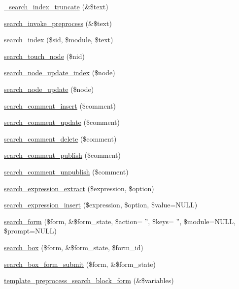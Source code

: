 \begin{DoxyCompactItemize}
\item 
\hyperlink{search_8module_a8cad6e5cadb04b33e53bd4872b8f37b4}{\_\-search\_\-index\_\-truncate} (\&\$text)
\item 
\hyperlink{search_8module_ae0bcee62601fbc35d2651764a04e5591}{search\_\-invoke\_\-preprocess} (\&\$text)
\item 
\hyperlink{group__search_ga57ab9f6e1c404a8c248293e554373ae6}{search\_\-index} (\$sid, \$module, \$text)
\item 
\hyperlink{search_8module_a7f33ab55bf14157d58997bbe149e515d}{search\_\-touch\_\-node} (\$nid)
\item 
\hyperlink{search_8module_ad314916727aaf74780b647fa381c89f6}{search\_\-node\_\-update\_\-index} (\$node)
\item 
\hyperlink{search_8module_a1067f1570b24d9647ec628bd93762bdd}{search\_\-node\_\-update} (\$node)
\item 
\hyperlink{search_8module_ade210f9ad2bba0665dfa46416c4b5377}{search\_\-comment\_\-insert} (\$comment)
\item 
\hyperlink{search_8module_a7bafc7986e46077bb7a03f9a5eeb05b2}{search\_\-comment\_\-update} (\$comment)
\item 
\hyperlink{search_8module_aafce819db105850b1570206f6dde2797}{search\_\-comment\_\-delete} (\$comment)
\item 
\hyperlink{search_8module_a33789acc1f4a944bf59f439e50eda30c}{search\_\-comment\_\-publish} (\$comment)
\item 
\hyperlink{search_8module_a6f61fc78d6436593fffa74762fb281b1}{search\_\-comment\_\-unpublish} (\$comment)
\item 
\hyperlink{search_8module_a6d0e1560509bebe41ba4c6a2959ce59c}{search\_\-expression\_\-extract} (\$expression, \$option)
\item 
\hyperlink{search_8module_a90b4fc5f716558dc1bf741c239fe1a0e}{search\_\-expression\_\-insert} (\$expression, \$option, \$value=NULL)
\item 
\hyperlink{group__search_gae12dc9da20e7e19853dfc18f92039d98}{search\_\-form} (\$form, \&\$form\_\-state, \$action= '', \$keys= '', \$module=NULL, \$prompt=NULL)
\item 
\hyperlink{group__forms_ga745b25ef751b20947460eb353f3be2af}{search\_\-box} (\$form, \&\$form\_\-state, \$form\_\-id)
\item 
\hyperlink{group__search_gaf91fe848f7f58fc3d63001198e485e00}{search\_\-box\_\-form\_\-submit} (\$form, \&\$form\_\-state)
\item 
\hyperlink{group__search_ga545a7c7108d985d17d8b8b4054ba66ef}{template\_\-preprocess\_\-search\_\-block\_\-form} (\&\$variables)

\end{DoxyCompactItemize}
